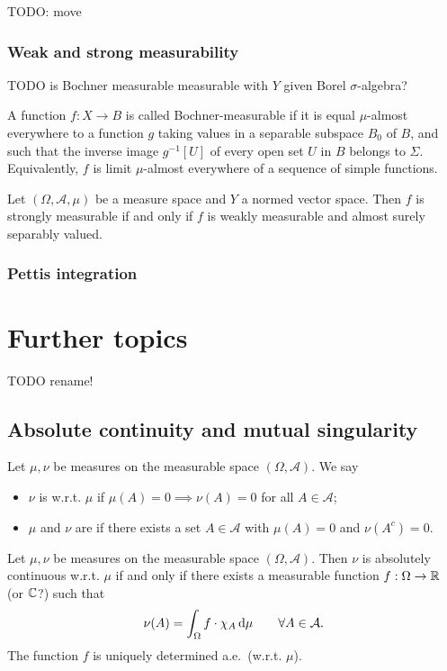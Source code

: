 TODO: move

\subsubsection{Weak and strong measurability}
TODO is Bochner measurable measurable with $Y$ given Borel $\sigma$-algebra?

A function $f:X\to B$ is called Bochner-measurable if it is equal $\mu$-almost everywhere to a function $g$ taking values in a separable subspace $B_{0}$ of $B$, and such that the inverse image $g^{-1}[U]$ of every open set $U$ in $B$ belongs to $\Sigma$. Equivalently, $f$ is limit $\mu$-almost everywhere of a sequence of simple functions. 

\begin{theorem}
Let $(\Omega, \mathcal{A},\mu)$ be a measure space and $Y$ a normed vector space. Then $f$ is strongly measurable \textup{if and only if} $f$ is weakly measurable and almost surely separably valued.
\end{theorem}



\subsubsection{Pettis integration}


\section{Further topics}
TODO rename!

\subsection{Absolute continuity and mutual singularity}
\begin{definition}
Let $\mu,\nu$ be measures on the measurable space $(\Omega,\mathcal{A})$. We say
\begin{itemize}
\item $\nu$ is  w.r.t. $\mu$ if $\mu(A)=0\implies \nu(A) = 0$ for all $A\in\mathcal{A}$;
\item $\mu$ and $\nu$ are  if there exists a set $A\in\mathcal{A}$ with $\mu(A) = 0$ and $\nu(A^c) = 0$.
\end{itemize}
\end{definition}

\begin{theorem}
Let $\mu,\nu$ be measures on the measurable space $(\Omega,\mathcal{A})$. Then $\nu$ is absolutely continuous w.r.t. $\mu$ \textup{if and only if} there exists a measurable function $f:\Omega\to\mathbb{R}$ (or $\mathbb{C}$?) such that
\[ \nu(A) = \int_\Omega f\cdot \chi_A \operatorname{d \!}{\mu} \qquad \forall A\in\mathcal{A}. \]
The function $f$ is uniquely determined a.e.\ (w.r.t. $\mu$).
\end{theorem}

